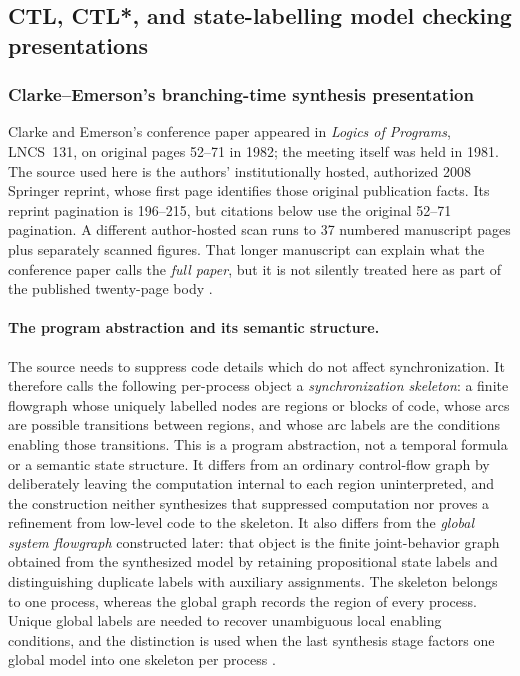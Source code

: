 
\subsection{CTL, CTL*, and state-labelling model checking presentations}
\label{sec:p09-presentation-n-c-016}

\subsubsection{Clarke--Emerson's branching-time synthesis presentation}
\label{sec:p09-presentation-n-c-016-clarke-emerson}

Clarke and Emerson's conference paper appeared in \emph{Logics of Programs},
LNCS~131, on original pages 52--71 in 1982; the meeting itself was held in
1981.  The source used here is the authors' institutionally hosted, authorized
2008 Springer reprint, whose first page identifies those original publication
facts.  Its reprint pagination is 196--215, but citations below use the
original 52--71 pagination.  A different author-hosted scan runs to 37
numbered manuscript pages plus separately scanned figures.  That longer
manuscript can explain what the conference paper calls the \emph{full paper},
but it is not silently treated here as part of the published twenty-page body
\cite[pp.~52--53, 70--71]{ClarkeEmerson1981}.

\paragraph{The program abstraction and its semantic structure.}
The source needs to suppress code details which do not affect
synchronization.  It therefore calls the following per-process object a
\emph{synchronization skeleton}: a finite flowgraph whose uniquely labelled
nodes are regions or blocks of code, whose arcs are possible transitions
between regions, and whose arc labels are the conditions enabling those
transitions.  This is a program abstraction, not a temporal formula or a
semantic state structure.  It differs from an ordinary control-flow graph by
deliberately leaving the computation internal to each region uninterpreted,
and the construction neither synthesizes that suppressed computation nor
proves a refinement from low-level code to the skeleton.  It also differs
from the \emph{global system flowgraph} constructed later:
that object is the finite joint-behavior graph obtained from the synthesized
model by retaining propositional state labels and distinguishing duplicate
labels with auxiliary assignments.  The skeleton belongs to one process,
whereas the global graph records the region of every process.  Unique global
labels are needed to recover unambiguous local enabling conditions, and the
distinction is used when the last synthesis stage factors one global model
into one skeleton per process
\cite[pp.~53--54, 63, 67--70]{ClarkeEmerson1981}.

